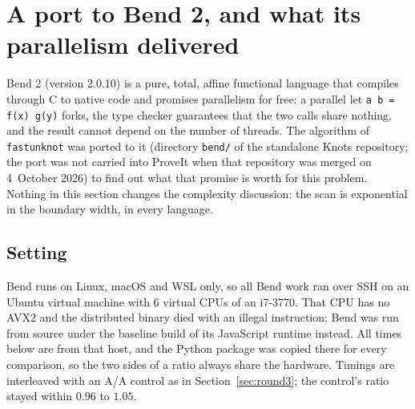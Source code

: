 \section{A port to Bend 2, and what its parallelism delivered}
\label{sec:bend}

Bend 2 (version 2.0.10) is a pure, total, affine functional language that compiles
through C to native code and promises parallelism for free: a parallel let
\texttt{a b = f(x) g(y)} forks, the type checker guarantees that the two calls
share nothing, and the result cannot depend on the number of threads. The
algorithm of \texttt{fastunknot} was ported to it (directory \texttt{bend/} of the
standalone Knots repository; the port was not carried into ProveIt when that
repository was merged on 4~October 2026) to
find out what that promise is worth for this problem. Nothing in this section
changes the complexity discussion: the scan is exponential in the boundary
width, in every language.

\subsection{Setting}
Bend runs on Linux, macOS and WSL only, so all Bend work ran over SSH on an
Ubuntu virtual machine with 6 virtual CPUs of an i7-3770. That CPU has no AVX2
and the distributed binary died with an illegal instruction; Bend was run from
source under the baseline build of its JavaScript runtime instead. All times
below are from that host, and the Python package was copied there for every
comparison, so the two sides of a ratio always share the hardware. Timings are
interleaved with an A/A control as in Section~\ref{sec:round3}; the control's
ratio stayed within $0.96$ to $1.05$.

